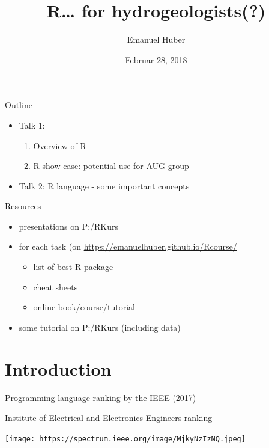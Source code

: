 \documentclass[8pt,ignorenonframetext,]{beamer}
\title{R\ldots{} for hydrogeologists(?)}
\author{Emanuel Huber}
\date{Februar 28, 2018}
\providecommand{\tightlist}{%
  \setlength{\itemsep}{0pt}\setlength{\parskip}{0pt}}
\begin{document}
\frame{\titlepage}

\begin{frame}

\end{frame}

\begin{frame}{Outline}

\begin{itemize}
\tightlist
\item
  Talk 1:

  \begin{enumerate}
  \def\labelenumi{\arabic{enumi}.}
  \tightlist
  \item
    Overview of R
  \item
    R show case: potential use for AUG-group\\
  \end{enumerate}
\item
  Talk 2: R language - some important concepts
\end{itemize}

\begin{block}{Resources}

\begin{itemize}
\tightlist
\item
  presentations on P:/RKurs
\item
  for each task (on \url{https://emanuelhuber.github.io/Rcourse/}

  \begin{itemize}
  \tightlist
  \item
    list of best R-package
  \item
    cheat sheets
  \item
    online book/course/tutorial
  \end{itemize}
\item
  some tutorial on P:/RKurs (including data)
\end{itemize}

\end{block}

\end{frame}

\section{Introduction}\label{introduction}

\begin{frame}{Programming language ranking by the IEEE (2017)}

\href{https://spectrum.ieee.org/computing/software/the-2017-top-programming-languages}{Institute
of Electrical and Electronics Engineers ranking}

\texttt{[image: https://spectrum.ieee.org/image/MjkyNzIzNQ.jpeg]}

\end{frame}
\end{document}
